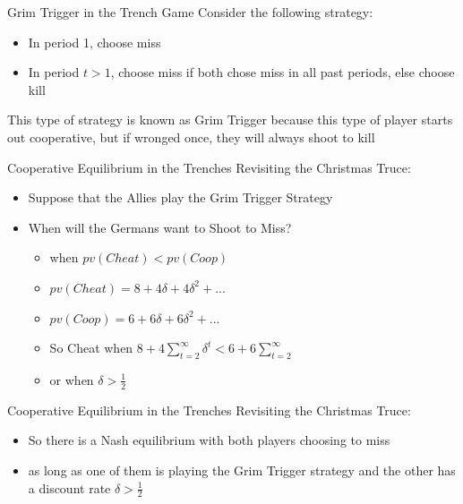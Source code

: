 \begin{frame}{Grim Trigger in the Trench Game}
  Consider the following strategy: 
  \begin{itemize}
    \item In period 1, choose miss
    \item In period $t>1$, choose miss if both chose miss in all past periods, else choose kill
  \end{itemize}
  This type of strategy is known as \alert{Grim Trigger} because this type of player starts out cooperative, but if wronged once, they will always shoot to kill
\end{frame}

\begin{frame}{Cooperative Equilibrium in the Trenches}
  Revisiting the Christmas Truce:
  \begin{itemize}
    \item Suppose that the Allies play the Grim Trigger Strategy
    \item When will the Germans want to Shoot to Miss?
    \pause
    \begin{itemize}
      \item when $pv(Cheat) < pv(Coop)$
      \item $pv(Cheat) = 8 + 4\delta + 4 \delta^2 + ... $
      \item $pv(Coop) = 6 + 6\delta + 6 \delta^2 + ... $
      \item So Cheat when $ 8 + 4 \sum_{t=2}^\infty \delta^t < 6 + 6 \sum_{t=2}^\infty$
      \item or when $\delta > \frac{1}{2}$
    \end{itemize}
  \end{itemize}
\end{frame}

\begin{frame}{Cooperative Equilibrium in the Trenches}
  Revisiting the Christmas Truce:
  \begin{itemize}
    \item So there is a Nash equilibrium with both players choosing to miss
    \item as long as one of them is playing the Grim Trigger strategy and the other has a discount rate $\delta > \frac{1}{2}$
  \end{itemize}
\end{frame}
